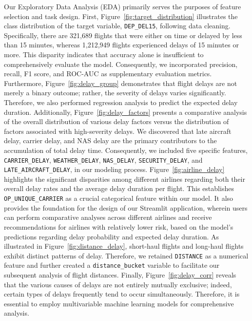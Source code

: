 Our Exploratory Data Analysis (EDA) primarily serves the purposes of feature selection and task design. First, Figure~\ref{fig:target_distribution} illustrates the class distribution of the target variable, \texttt{DEP\_DEL15}, following data cleaning. Specifically, there are 321,689 flights that were either on time or delayed by less than 15 minutes, whereas 1,212,949 flights experienced delays of 15 minutes or more. This disparity indicates that accuracy alone is insufficient to comprehensively evaluate the model. Consequently, we incorporated precision, recall, F1 score, and ROC-AUC as supplementary evaluation metrics. Furthermore, Figure~\ref{fig:delay_group} demonstrates that flight delays are not merely a binary outcome; rather, the severity of delays varies significantly. Therefore, we also performed regression analysis to predict the expected delay duration. Additionally, Figure~\ref{fig:delay_factors} presents a comparative analysis of the overall distribution of various delay factors versus the distribution of factors associated with high-severity delays. We discovered that late aircraft delay, carrier delay, and NAS delay are the primary contributors to the accumulation of total delay time. Consequently, we included five specific features, \texttt{CARRIER\_DELAY}, \texttt{WEATHER\_DELAY}, \texttt{NAS\_DELAY}, \texttt{SECURITY\_DELAY}, and \texttt{LATE\_AIRCRAFT\_DELAY}, in our modeling process. Figure~\ref{fig:airline_delay} highlights the significant disparities among different airlines regarding both their overall delay rates and the average delay duration per flight. This establishes \texttt{OP\_UNIQUE\_CARRIER} as a crucial categorical feature within our model. It also provides the foundation for the design of our Streamlit application, wherein users can perform comparative analyses across different airlines and receive recommendations for airlines with relatively lower risk, based on the model's predictions regarding delay probability and expected delay duration. As illustrated in Figure~\ref{fig:distance_delay}, short-haul flights and long-haul flights exhibit distinct patterns of delay. Therefore, we retained \texttt{DISTANCE} as a numerical feature and further created a \texttt{distance\_bucket} variable to facilitate our subsequent analysis of flight distances. Finally, Figure~\ref{fig:delay_corr} reveals that the various causes of delays are not entirely mutually exclusive; indeed, certain types of delays frequently tend to occur simultaneously. Therefore, it is essential to employ multivariable machine learning models for comprehensive analysis.

